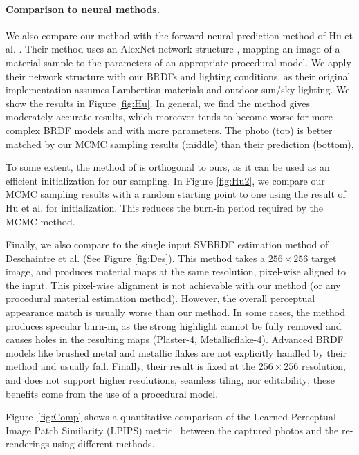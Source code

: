 \paragraph*{Comparison to neural methods.}
We also compare our method with the forward neural prediction method of Hu et al. \cite{Hu2019}. Their method uses an AlexNet network structure \cite{krizhevsky2012imagenet}, mapping an image of a material sample to the parameters of an appropriate procedural model. We apply their network structure with our BRDFs and lighting conditions, as their original implementation assumes Lambertian materials and outdoor sun/sky lighting. We show the results in Figure \ref{fig:Hu}. In general, we find the method gives moderately accurate results, which moreover tends to become worse for more complex BRDF models and with more parameters. The photo (top) is better matched by our MCMC sampling results (middle) than their prediction (bottom),

To some extent, the method of \cite{Hu2019} is orthogonal to ours, as it can be used as an efficient initialization for our sampling. In Figure \ref{fig:Hu2}, we compare our MCMC sampling results with a random starting point to one using the result of Hu et al. for initialization. This reduces the burn-in period required by the MCMC method.

Finally, we also compare to the single input SVBRDF estimation method of Deschaintre et al. \cite{Deschaintre2018} (See Figure \ref{fig:Des}). This method takes a $256 \times 256$ target image, and produces material maps at the same resolution, pixel-wise aligned to the input. This pixel-wise alignment is not achievable with our method (or any procedural material estimation method). However, the overall perceptual appearance match is usually worse than our method. In some cases, the method produces specular burn-in, as the strong highlight cannot be fully removed and causes holes in the resulting maps (Plaster-4, Metallicflake-4). Advanced BRDF models like brushed metal and metallic flakes are not explicitly handled by their method and usually fail. Finally, their result is fixed at the $256 \times 256$ resolution, and does not support higher resolutions, seamless tiling, nor editability; these benefits come from the use of a procedural model.

Figure~\ref{fig:Comp} shows a quantitative comparison of the Learned Perceptual Image Patch Similarity (LPIPS) metric~\cite{zhang2018unreasonable} between the captured photos and the re-renderings using different methods.

